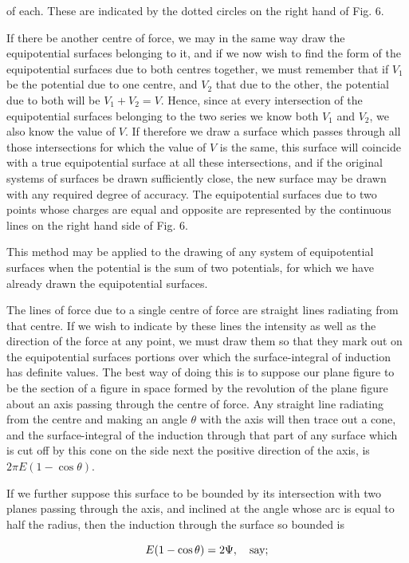 \documentclass[11pt,a4paper]{article}
\begin{document}
of each. These are indicated by the dotted circles on the right hand of Fig. 6.

If there be another centre of force, we may in the same way draw the equipotential surfaces belonging to it, and if we now wish to find the form of the equipotential surfaces due to both centres together, we must remember that if $V_1$ be the potential due to one centre, and $V_2$ that due to the other, the potential due to both will be $V_1+V_2=V$. Hence, since at every intersection of the equipotential surfaces belonging to the two series we know both $V_1$ and $V_2$, we also know the value of $V$. If therefore we draw a surface which passes through all those intersections for which the value of $V$ is the same, this surface will coincide with a true equipotential surface at all these intersections, and if the original systems of surfaces be drawn sufficiently close, the new surface may be drawn with any required degree of accuracy. The equipotential surfaces due to two points whose charges are equal and opposite are represented by the continuous lines on the right hand side of Fig. 6.

This method may be applied to the drawing of any system of equipotential surfaces when the potential is the sum of two potentials, for which we have already drawn the equipotential surfaces.

The lines of force due to a single centre of force are straight lines radiating from that centre. If we wish to indicate by these lines the intensity as well as the direction of the force at any point, we must draw them so that they mark out on the equipotential surfaces portions over which the surface-integral of induction has definite values. The best way of doing this is to suppose our plane figure to be the section of a figure in space formed by the revolution of the plane figure about an axis passing through the centre of force. Any straight line radiating from the centre and making an angle $\theta$ with the axis will then trace out a cone, and the surface-integral of the induction through that part of any surface which is cut off by this cone on the side next the positive direction of the axis, is $2\pi E(1-\cos\theta)$.

If we further suppose this surface to be bounded by its intersection with two planes passing through the axis, and inclined at the angle whose arc is equal to half the radius, then the induction through the surface so bounded is

\[
E(1-\cos\theta)=2\Psi,\quad\hbox{say};
\]
  
\end{document}
